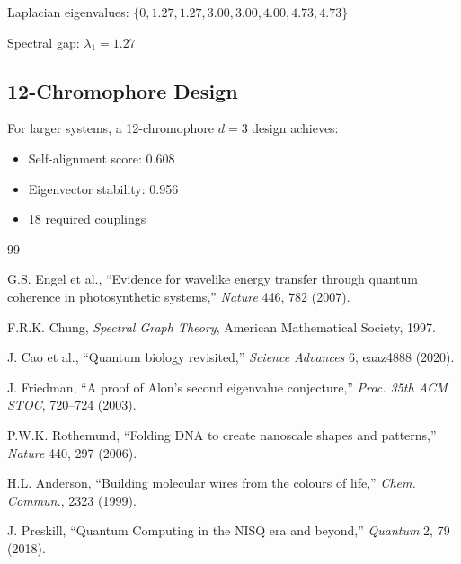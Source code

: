 \documentclass[11pt,a4paper]{article}
\theoremstyle{plain}
\theoremstyle{definition}
\theoremstyle{remark}
\begin{document}
Laplacian eigenvalues: $\{0, 1.27, 1.27, 3.00, 3.00, 4.00, 4.73, 4.73\}$

Spectral gap: $\lambda_1 = 1.27$

\subsection{12-Chromophore Design}

For larger systems, a 12-chromophore $d=3$ design achieves:
\begin{itemize}
    \item Self-alignment score: 0.608
    \item Eigenvector stability: 0.956
    \item 18 required couplings
\end{itemize}

\begin{thebibliography}{99}

 G.S. Engel et al., ``Evidence for wavelike energy transfer through quantum coherence in photosynthetic systems,'' \textit{Nature} 446, 782 (2007).

 F.R.K. Chung, \textit{Spectral Graph Theory}, American Mathematical Society, 1997.

 J. Cao et al., ``Quantum biology revisited,'' \textit{Science Advances} 6, eaaz4888 (2020).

 J. Friedman, ``A proof of Alon's second eigenvalue conjecture,'' \textit{Proc. 35th ACM STOC}, 720--724 (2003).

 P.W.K. Rothemund, ``Folding DNA to create nanoscale shapes and patterns,'' \textit{Nature} 440, 297 (2006).

 H.L. Anderson, ``Building molecular wires from the colours of life,'' \textit{Chem. Commun.}, 2323 (1999).

 J. Preskill, ``Quantum Computing in the NISQ era and beyond,'' \textit{Quantum} 2, 79 (2018).

\end{thebibliography}
\end{document}
